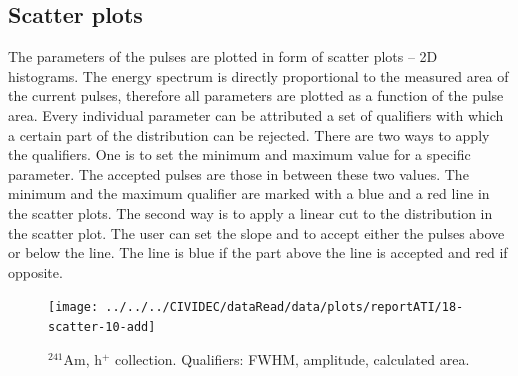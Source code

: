 \subsection{Scatter plots}
The parameters of the pulses are plotted in form of scatter plots -- 2D histograms. The energy spectrum is directly proportional to the measured area of the current pulses, therefore all parameters are plotted as a function of the pulse area. 
Every individual parameter can be attributed a set of qualifiers with which a certain part of the distribution can be rejected. There are two ways to apply the qualifiers. One is to set the minimum and maximum value for a specific parameter. The accepted pulses are those in between these two values. The minimum and the maximum qualifier are marked with a blue and a red line in the scatter plots. The second way is to apply a linear cut to the distribution in the scatter plot. The user can set the slope and to accept either the pulses above or below the line. The line is blue if the part above the line is accepted and red if opposite. %



 

\clearpage
\begin{figure}[]
\centering
\texttt{[image: ../../../CIVIDEC/dataRead/data/plots/reportATI/18-scatter-10-add]}
\caption{$^{241}$Am, h$^{+}$ collection. Qualifiers: FWHM, amplitude, calculated area.}
\label{fig:scatterah}
\end{figure}

